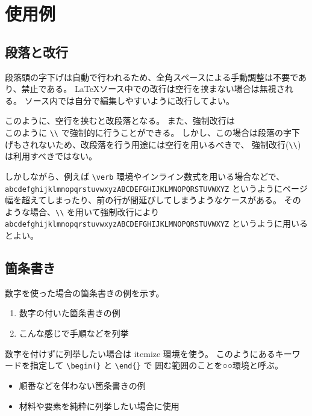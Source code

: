 \chapter{使用例}
\label{chp:first}

\section{段落と改行}
\label{sec:paragraph}

段落頭の字下げは自動で行われるため、全角スペースによる手動調整は不要であり、禁止である。
\LaTeX ソース中での改行は空行を挟まない場合は無視される。
ソース内では自分で編集しやすいように改行してよい。

このように、空行を挟むと改段落となる。
また、強制改行は\\このように \verb+\\+ で強制的に行うことができる。
しかし、この場合は段落の字下げもされないため、改段落を行う用途には空行を用いるべきで、
強制改行(\verb+\\+)は利用すべきではない。

しかしながら、例えば \verb+\verb+ 環境やインライン数式を用いる場合などで、
\verb+abcdefghijklmnopqrstuvwxyzABCDEFGHIJKLMNOPQRSTUVWXYZ+ 
というようにページ幅を超えてしまったり、前の行が間延びしてしまうようなケースがある。
そのような場合、\verb+\\+ を用いて強制改行により \\
\verb+abcdefghijklmnopqrstuvwxyzABCDEFGHIJKLMNOPQRSTUVWXYZ+ 
というように用いるとよい。

\section{箇条書き}
\label{sec:enum}

数字を使った場合の箇条書きの例を示す。

\begin{enumerate}
 \item 数字の付いた箇条書きの例
 \item こんな感じで手順などを列挙
\end{enumerate}

数字を付けずに列挙したい場合は itemize 環境を使う。
このようにあるキーワードを指定して \verb+\begin(}+ と \verb+\end{}+ で
囲む範囲のことを○○環境と呼ぶ。

\begin{itemize}
 \item 順番などを伴わない箇条書きの例
 \item 材料や要素を純粋に列挙したい場合に使用
\end{itemize}

